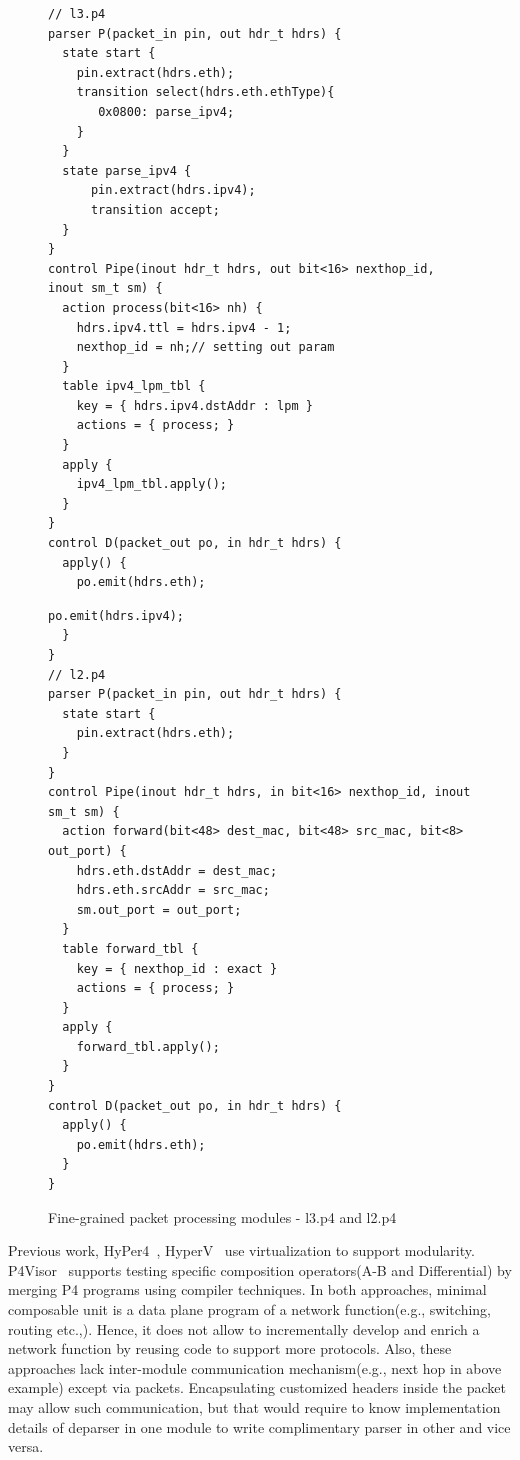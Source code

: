 \documentclass[10pt,sigconf,letterpaper,anonymous]{acmart}
\begin{document}
\begin{figure}
\noindent \begin{minipage}[t]{.48\textwidth}
\begin{lstlisting}[frame=none]
// l3.p4
parser P(packet_in pin, out hdr_t hdrs) {
  state start {
    pin.extract(hdrs.eth);
    transition select(hdrs.eth.ethType){
       0x0800: parse_ipv4;
    }
  }
  state parse_ipv4 {
      pin.extract(hdrs.ipv4);
      transition accept;
  }
}
control Pipe(inout hdr_t hdrs, out bit<16> nexthop_id, inout sm_t sm) {
  action process(bit<16> nh) {
    hdrs.ipv4.ttl = hdrs.ipv4 - 1;
    nexthop_id = nh;// setting out param
  }
  table ipv4_lpm_tbl {
    key = { hdrs.ipv4.dstAddr : lpm } 
    actions = { process; }
  }
  apply {
    ipv4_lpm_tbl.apply();
  }
}
control D(packet_out po, in hdr_t hdrs) {
  apply() {
    po.emit(hdrs.eth);
\end{lstlisting}
\end{minipage}
\hfill\begin{minipage}[t]{.48\textwidth}
\begin{lstlisting}[frame=none]
    po.emit(hdrs.ipv4);
  }
}
// l2.p4
parser P(packet_in pin, out hdr_t hdrs) {
  state start {
    pin.extract(hdrs.eth);
  }
}
control Pipe(inout hdr_t hdrs, in bit<16> nexthop_id, inout sm_t sm) {
  action forward(bit<48> dest_mac, bit<48> src_mac, bit<8> out_port) {
    hdrs.eth.dstAddr = dest_mac;
    hdrs.eth.srcAddr = src_mac;
    sm.out_port = out_port;    
  }
  table forward_tbl {
    key = { nexthop_id : exact } 
    actions = { process; }
  }
  apply {
    forward_tbl.apply();
  }
}
control D(packet_out po, in hdr_t hdrs) {
  apply() {
    po.emit(hdrs.eth);
  }
}
\end{lstlisting}
\end{minipage}
\vspace*{-10pt}
\caption{Fine-grained packet processing modules - l3.p4  and l2.p4}
\label{fig:l3.p4.l2.p4}
\end{figure}


Previous work, HyPer4~\cite{Hancock:2016:HUP:2999572.2999607}, HyperV~\cite{8038396} use virtualization to support modularity.
P4Visor~\cite{Zheng:2018:PLV:3281411.3281436} supports testing specific composition operators(A-B and Differential) by merging P4 programs using compiler techniques.
In both approaches, minimal composable unit is a data plane program of a network function(e.g., switching, routing etc.,). 
Hence, it does not allow to incrementally develop and enrich a network function by reusing code to support more protocols.
Also, these approaches lack inter-module communication mechanism(e.g., next hop in above example) except via packets.
Encapsulating customized headers inside the packet may allow such communication, but that would require to know
implementation details of deparser in one module to write complimentary parser in other and vice versa. 
\end{document}
